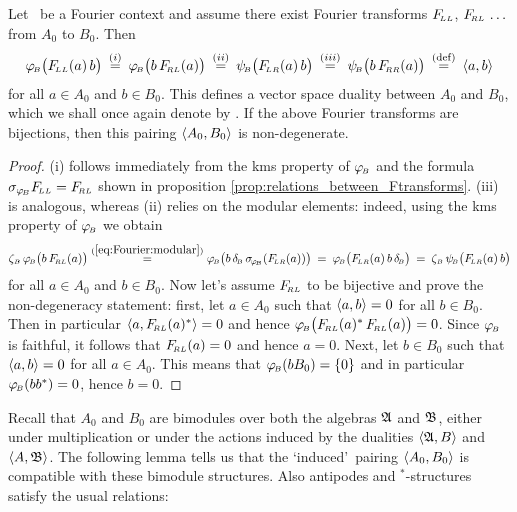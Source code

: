 \begin{lemma_sec}  \label{lemma:induced_pairing}
Let \FourierBABA\ be a Fourier context and assume there exist Fourier transforms\/
$F_{\!\scriptscriptstyle LL}$, $F_{\!\scriptscriptstyle RL} \,\ldots$ from\/ $A_0$ to\/ $B_0$. Then
$$                           \phiB\!\left(\FLL(a)\, b \vertM\right)
   \:\stackrel{(i)}{=}\:     \phiB\!\left(b \,\FRL(a)\vertM\right)
   \:\stackrel{(ii)}{=}\:    \psiB\!\left(\FLR(a) \, b\vertM\right)
   \:\stackrel{(iii)}{=}\:   \psiB\!\left(b \, \FRR(a)\vertM\right)
   \:\stackrel{\rm (def)}{=}\: \pair{a}{b}
$$
for all\/ $a \in A_0$ and\/ $b \in B_0$.
This defines a vector space duality between\/ $A_0$ and\/ $B_0$,
which we shall once again denote by \pairing\@.
If the above Fourier transforms are bijections, then this pairing\/
$\langle A_0,B_0 \rangle$ is non-degenerate.
\end{lemma_sec}
\begin{proof}
(i) follows immediately from the {\sc kms} property of $\varphi_{\scriptscriptstyle \! B}$
and the formula $\sigma_{\varphi_{\scriptscriptstyle \! B}} F_{\!\scriptscriptstyle LL} = F_{\!\scriptscriptstyle RL}$
shown in proposition \ref{prop:relations_between_Ftransforms}\@.
(iii) is analogous, whereas (ii) relies on the modular elements:
indeed, using the {\sc kms} property of $\varphi_{\scriptscriptstyle \! B}$ we obtain
$$ \zetaB \, \phiB\!\left(b \, \FRL(a)\vertM\right)
           \stackrel{(\ref{eq:Fourier:modular})}{=}
   \phiB\!\left(b \, \deltaB\, \sigma_{\!\phiB}(\FLR(a))\vertM\right)
          \:=\:
   \phiB\!\left(\FLR(a)\, b \, \deltaB \vertM\right)
          \:=\:
   \zetaB \, \psiB\!\left(\FLR(a)\, b \vertM\right) $$
for all $a \in A_0$ and $b \in B_0$.
Now let's assume $F_{\!\scriptscriptstyle RL}$ to be bijective and prove the non-degeneracy statement:
first, let $a \in A_0$ such that $\langle a,b \rangle=0$ for all $b \in B_0$.
Then in particular $\langle a,F_{\!\scriptscriptstyle RL}(a)^* \rangle=0$ and hence
$\phiB\! \left(\FRL(a)^*\,\FRL(a)\vertM\right) =0$.
Since $\varphi_{\scriptscriptstyle \! B}$ is faithful, it follows that $F_{\!\scriptscriptstyle RL}(a)=0$ and hence $a=0$.
Next, let $b \in B_0$  such that $\langle a,b \rangle=0$ for all $a \in A_0$.
This means that $\varphi_{\scriptscriptstyle \! B}(b B_0)=\{0\}$ and in particular $\varphi_{\scriptscriptstyle \! B}(b b^*)=0$, hence $b=0$.
\end{proof}
\vspace{2ex}

Recall that $A_0$ and $B_0$ are bimodules over both the algebras
$\mathfrak A$ and $\mathfrak B$, either under multiplication or under the actions
induced by the dualities $\langle \mathfrak A,B \rangle$ and $\langle A,\mathfrak B \rangle$.
The following lemma tells us that the \lq induced\rq\ pairing $\langle A_0,B_0 \rangle$
is compatible with these bimodule structures. Also antipodes and $^*$-structures
satisfy the usual relations:

